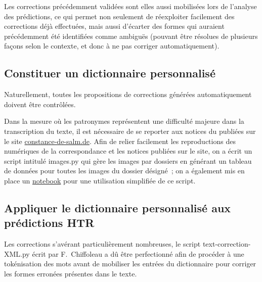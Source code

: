 \documentclass[a4paper,12pt,twoside]{book}
\begin{document}
				Les corrections précédemment validées sont elles aussi mobilisées lors de l'analyse des prédictions, ce qui permet non seulement de réexploiter facilement des corrections déjà effectuées, mais aussi d'écarter des formes qui auraient précédemment été identifiées comme ambiguës (pouvant être résolues de plusieurs façons selon le contexte, et donc à ne pas corriger automatiquement).
				
			\subsection{Constituer un dictionnaire personnalisé}
				Naturellement, toutes les propositions de corrections générées automatiquement doivent être contrôlées.
				
				Dans la mesure où les patronymes représentent une difficulté majeure dans la transcription du texte, il est nécessaire de se reporter aux notices du publiées sur le site \href{https://constance-de-salm.de}{constance-de-salm.de}. Afin de relier facilement les reproductions des numériques de la correspondance et les notices publiées sur le site, on a écrit un script intitulé \textsf{images.py} qui gère les images par dossiers en générant un tableau de données pour toutes les images du dossier désigné~; on a également mis en place un \href{https://github.com/sbiay/CdS-edition/blob/main/donnees/Obtenir_metadonnees_images.ipynb}{notebook} pour une utilisation simplifiée de ce script.

			\subsection{Appliquer le dictionnaire personnalisé aux prédictions HTR}
				Les corrections s'avérant particulièrement nombreuses, le script \textsf{text-correction-XML.py} écrit par F.~Chiffoleau a dû être perfectionné afin de procéder à une tokénisation des mots avant de mobiliser les entrées du dictionnaire pour corriger les formes erronées présentes dans le texte.
				
	\appendix
	
	\renewcommand{\appendixpagename}{Annexes}
	
	\renewcommand{\appendixtocname}{Annexes}
	
	\addappheadtotoc%
	
	\appendixpage %
\end{document}
